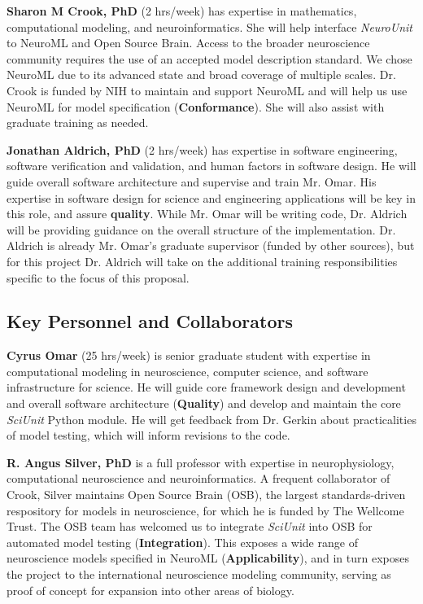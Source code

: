 \documentclass[11pt,letterpaper]{article}
\begin{document}
\textbf{Sharon M Crook, PhD} (2 hrs/week) has expertise in mathematics, computational modeling, and neuroinformatics.  She will help interface \textit{NeuroUnit} to NeuroML and Open Source Brain. Access to the broader neuroscience community requires the use of an accepted model description standard.  We chose NeuroML due to its advanced state and broad coverage of multiple scales.  Dr. Crook is funded by NIH to maintain and support NeuroML and will help us use NeuroML for model specification (\textbf{Conformance}).  She will also assist with graduate training as needed.  

\textbf{Jonathan Aldrich, PhD} (2 hrs/week) has expertise in software engineering, software verification and validation, and human factors in software design. He will guide overall software architecture and supervise and train Mr. Omar.  His expertise in software design for science and engineering applications will be key in this role, and assure \textbf{quality}.  While Mr. Omar will be writing code, Dr. Aldrich will be providing guidance on the overall structure of the implementation.  Dr. Aldrich is already Mr. Omar's graduate supervisor (funded by other sources), but for this project Dr. Aldrich will take on the additional training responsibilities specific to the focus of this proposal.  

\subsection{Key Personnel and Collaborators}
\textbf{Cyrus Omar} (25 hrs/week) is senior graduate student with expertise in computational modeling in neuroscience, computer science, and software infrastructure for science.  He will guide core framework design and development and overall software architecture (\textbf{Quality}) and develop and maintain the core \textit{SciUnit} Python module.  He will get feedback from Dr. Gerkin about practicalities of model testing, which will inform revisions to the code.  

\textbf{R. Angus Silver, PhD} is a full professor with expertise in neurophysiology, computational neuroscience and neuroinformatics.  
A frequent collaborator of Crook, Silver maintains Open Source Brain (OSB), the largest standards-driven respository for models in neuroscience, for which he is funded by The Wellcome Trust.  
The OSB team has welcomed us to integrate \textit{SciUnit} into OSB for automated model testing (\textbf{Integration}).  
This exposes a wide range of neuroscience models specified in NeuroML (\textbf{Applicability}), and in turn exposes the project to the international neuroscience modeling community, serving as proof of concept for expansion into other areas of biology.  
\end{document}
